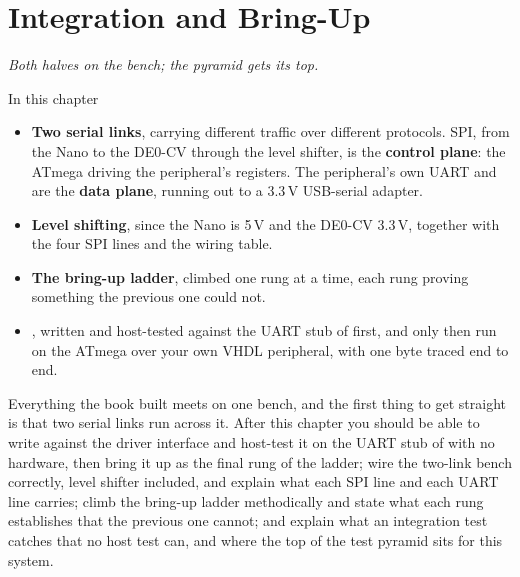 
\chapter{Integration and Bring-Up}
\label{c10:ch}

{\large\itshape Both halves on the bench; the pyramid gets its top.\par}

\begin{chapterbox}{In this chapter}
\begin{itemize}
  \item \textbf{Two serial links}, carrying different traffic over different protocols. SPI, from
    the Nano to the DE0-CV through the level shifter, is the \textbf{control plane}: the ATmega
    driving the peripheral's registers. The peripheral's own UART  and  are the
    \textbf{data plane}, running out to a 3.3\,V USB-serial adapter.
  \item \textbf{Level shifting}, since the Nano is 5\,V and the DE0-CV 3.3\,V, together with the
    four SPI lines and the wiring table.
  \item \textbf{The bring-up ladder}, climbed one rung at a time, each rung proving something the
    previous one could not.
  \item \textbf{}, written and host-tested against the UART stub of 
    first, and only then run on the ATmega over your own VHDL peripheral, with one byte traced end
    to end.
\end{itemize}
\end{chapterbox}

Everything the book built meets on one bench, and the first thing to get straight is that two serial
links run across it. After this chapter you should be able to write  against the
driver interface and host-test it on the UART stub of  with no hardware, then bring it up
as the final rung of the ladder; wire the two-link bench correctly, level shifter included, and
explain what each SPI line and each UART line carries; climb the bring-up ladder methodically and
state what each rung establishes that the previous one cannot; and explain what an integration test
catches that no host test can, and where the top of the test pyramid sits for this system.

